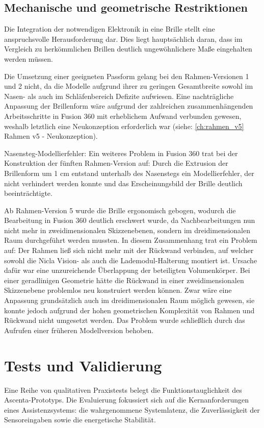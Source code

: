 \subsection{Mechanische und geometrische Restriktionen}
Die Integration der notwendigen Elektronik in eine Brille stellt eine anspruchsvolle Herausforderung dar. Dies liegt hauptsächlich daran, dass im Vergleich zu herkömmlichen Brillen deutlich ungewöhnlichere Maße eingehalten werden müssen.

Die Umsetzung einer geeigneten Passform gelang bei den Rahmen-Versionen 1 und 2 nicht, da die Modelle aufgrund ihrer zu geringen Gesamtbreite sowohl im Nasen- als auch im Schläfenbereich Defizite aufwiesen. Eine nachträgliche Anpassung der Brillenform wäre aufgrund der zahlreichen zusammenhängenden Arbeitsschritte in Fusion 360 mit erheblichem Aufwand verbunden gewesen, weshalb letztlich eine Neukonzeption erforderlich war (siehe: \ref{ch:rahmen_v5} Rahmen v5 - Neukonzeption).

\label{sec:modellierfehler_nasensteg}
Nasensteg-Modellierfehler: Ein weiteres Problem in Fusion 360 trat bei der Konstruktion der fünften Rahmen-Version auf: Durch die Extrusion der Brillenform um 1 cm entstand unterhalb des Nasenstegs ein Modellierfehler, der nicht verhindert werden konnte und das Erscheinungsbild der Brille deutlich beeinträchtigte.

Ab Rahmen-Version 5 wurde die Brille ergonomisch gebogen, wodurch die Bearbeitung in Fusion 360 deutlich erschwert wurde, da Nachbearbeitungen nun nicht mehr in zweidimensionalen Skizzenebenen, sondern im dreidimensionalen Raum durchgeführt werden mussten.
In diesem Zusammenhang trat ein Problem auf: Der Rahmen ließ sich nicht mehr mit der Rückwand verbinden, auf welcher sowohl die Nicla Vision- als auch die Lademodul-Halterung montiert ist. Ursache dafür war eine unzureichende Überlappung der beteiligten Volumenkörper.
Bei einer geradlinigen Geometrie hätte die Rückwand in einer zweidimensionalen Skizzenebene problemlos neu konstruiert werden können. Zwar wäre eine Anpassung grundsätzlich auch im dreidimensionalen Raum möglich gewesen, sie konnte jedoch aufgrund der hohen geometrischen Komplexität von Rahmen und Rückwand nicht umgesetzt werden. Das Problem wurde schließlich durch das Aufrufen einer früheren Modellversion behoben.

\section{Tests und Validierung}
Eine Reihe von qualitativen Praxistests belegt die Funktionstauglichkeit des \glqq Ascenta\grqq-Prototyps. Die Evaluierung fokussiert sich auf die Kernanforderungen eines Assistenzsystems: die wahrgenommene Systemlatenz, die Zuverlässigkeit der Sensoreingaben sowie die energetische Stabilität.

